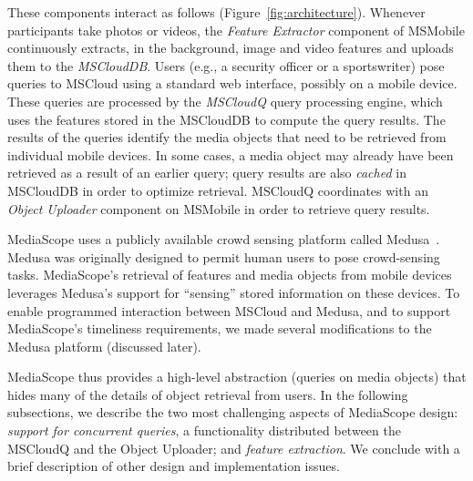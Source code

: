 These components interact as follows (Figure~\ref{fig:architecture}).
%
Whenever participants take photos or videos, the \emph{Feature
  Extractor} component of MSMobile continuously extracts, in the
background, image and video features and uploads them to the
\emph{MSCloudDB}.
%
Users (e.g., a security officer or a sportswriter) pose queries to MSCloud
using a standard web interface, possibly on a mobile device.
%
These queries are processed by the \emph{MSCloudQ} query processing
engine, which uses the features stored in the MSCloudDB to compute the
query results.
%
The results of the queries identify the media objects that need to be
retrieved from individual mobile devices.
%
In some cases, a media object may already have been retrieved as a
result of an earlier query; query results are also \emph{cached} in
MSCloudDB in order to optimize retrieval.
%
MSCloudQ coordinates with an \emph{Object Uploader} component on
MSMobile in order to retrieve query results.
%

MediaScope uses a publicly available crowd sensing platform called
Medusa~\cite{Medusa}.
%
Medusa was originally designed to permit human users to pose
crowd-sensing tasks.
%
MediaScope's retrieval of features and media objects from mobile
devices leverages Medusa's support for ``sensing'' stored information
on these devices.
%
To enable programmed interaction between MSCloud and Medusa, and to
support MediaScope's timeliness requirements, we made several
modifications to the Medusa platform (discussed later).

MediaScope thus provides a high-level abstraction (queries on media
objects) that hides many of the details of object retrieval from
users.
%
In the following subsections, we describe the two most challenging
aspects of MediaScope design: \emph{support for concurrent queries},
a functionality distributed between the MSCloudQ and the Object
Uploader; and \emph{feature extraction}.
%
We conclude with a brief description of other design and
implementation issues.


